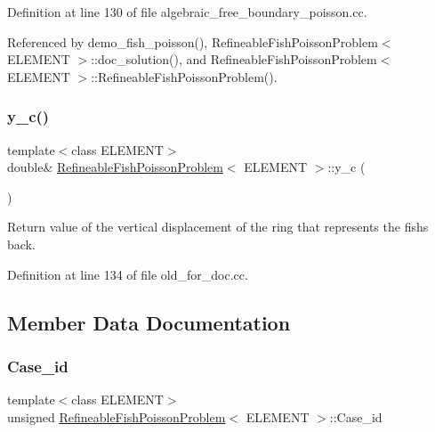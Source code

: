 Definition at line 130 of file algebraic\+\_\+free\+\_\+boundary\+\_\+poisson.\+cc.



Referenced by demo\+\_\+fish\+\_\+poisson(), Refineable\+Fish\+Poisson\+Problem$<$ E\+L\+E\+M\+E\+N\+T $>$\+::doc\+\_\+solution(), and Refineable\+Fish\+Poisson\+Problem$<$ E\+L\+E\+M\+E\+N\+T $>$\+::\+Refineable\+Fish\+Poisson\+Problem().

\mbox{\label{classRefineableFishPoissonProblem_a152227cc825ddea07cb06c2791f5995b}} 
\subsubsection{\texorpdfstring{y\+\_\+c()}{y\_c()}\hspace{0.1cm}{\footnotesize\ttfamily [2/2]}}
{\footnotesize\ttfamily template$<$class E\+L\+E\+M\+E\+NT$>$ \\
double\& \hyperlink{classRefineableFishPoissonProblem}{Refineable\+Fish\+Poisson\+Problem}$<$ E\+L\+E\+M\+E\+NT $>$\+::y\+\_\+c (\begin{DoxyParamCaption}{ }\end{DoxyParamCaption})\hspace{0.3cm}{\ttfamily [inline]}}



Return value of the vertical displacement of the ring that represents the fish\textquotesingle{}s back. 



Definition at line 134 of file old\+\_\+for\+\_\+doc.\+cc.



\subsection{Member Data Documentation}
\mbox{\label{classRefineableFishPoissonProblem_af6f409d7fe711ad809d9e784d98ca036}} 
\subsubsection{\texorpdfstring{Case\+\_\+id}{Case\_id}}
{\footnotesize\ttfamily template$<$class E\+L\+E\+M\+E\+NT$>$ \\
unsigned \hyperlink{classRefineableFishPoissonProblem}{Refineable\+Fish\+Poisson\+Problem}$<$ E\+L\+E\+M\+E\+NT $>$\+::Case\+\_\+id\hspace{0.3cm}{\ttfamily [private]}}



